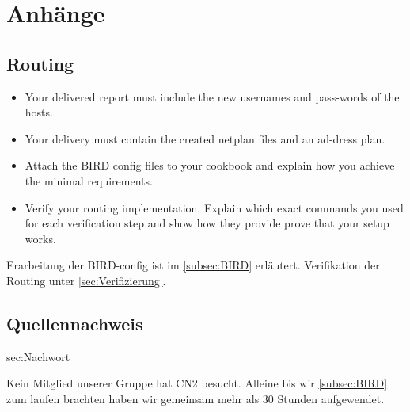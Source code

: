 \documentclass[11pt,titlepage]{article}
\newenvironment{shadedquotation}
 {\begin{shaded*}
  \quoting[leftmargin=0pt, vskip=0pt]
 }
 {\endquoting
 \end{shaded*}
}
\begin{document}
\section{Anhänge}
\label{sec:Anhänge}

\subsection{Routing}
\label{subsec:Routing}
\begin{shadedquotation}
  \begin{itemize}
    \item Your delivered report must include the new usernames and pass-words of the hosts.
    \item Your delivery must contain the created netplan files and an ad-dress plan.
    \item Attach the BIRD config files to your cookbook and explain how you achieve the minimal requirements.
    \item Verify your routing implementation. Explain which exact commands you used for each verification step and show how they provide prove that your setup works.
  \end{itemize}
\end{shadedquotation}
Erarbeitung der BIRD-config ist im \ref{subsec:BIRD} erläutert.
Verifikation der Routing unter \ref{sec:Verifizierung}.

\subsection{Quellennachweis}
\label{subsec:Quellennachweis}

\begingroup
\renewcommand{\section}[2]{}%


\endgroup  

\section{Nachwort}
\label{sec:Nachwort}

Kein Mitglied unserer Gruppe hat CN2 besucht. Alleine bis wir \ref{subsec:BIRD} zum laufen brachten haben wir gemeinsam mehr als 30 Stunden aufgewendet. 
\end{document}
